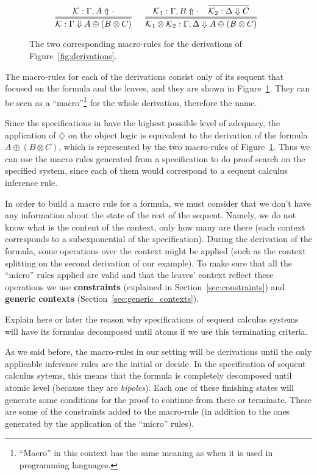 \begin{figure}
$$
\infer=[]{\mathcal{K} : \Gamma \Downarrow A \oplus (B \otimes C)}{\mathcal{K} :
\Gamma, A \Uparrow \cdot}
\;\;\;\;
\infer=[]{\mathcal{K}_1 \otimes \mathcal{K}_2 : \Gamma, \Delta \Downarrow A \oplus (B \otimes C)}
{
  \mathcal{K}_1 : \Gamma, B \Uparrow \cdot \;\;\;\;
  \infer[]{\mathcal{K}_2 : \Delta \Downarrow C}{}
}
$$
\caption{The two corresponding macro-rules for the derivations of
Figure~\ref{fig:derivations}.}
\label{fig:macro}
\end{figure}


The macro-rules for each of the derivations consist only of its sequent that
focused on the formula and
the leaves, and they are shown in Figure~\ref{fig:macro}. They can be seen as a 
``macro''\footnote{``Macro'' in this context has
the same meaning as when it is used in programming languages.} for the whole 
derivation, therefore the name.

Since the specifications in \sellf have the highest possible level of adequacy, the
application of $\diamondsuit$ on the object logic is equivalent to the derivation of
the formula $A \oplus (B \otimes C)$, which is represented by the two macro-rules
of Figure~\ref{fig:macro}. Thus we can use the macro rules generated from a
specification to do proof search on the specified system, since each of them
would correspond to a sequent calculus inference rule. 

In order to build a macro rule for a formula, we must consider that we don't
have any information about the state of the rest of the sequent. Namely, we do
not know what is the content of the context, only how many are there (each
context corresponds to a subexponential of the specification). During the
derivation of the formula, some operations over the context might be applied
(such as the context splitting on the second derivation of our example). To
make sure that all the ``micro'' rules applied are valid and that the leaves'
context reflect these operations we use
\textbf{constraints} (explained in Section~\ref{sec:constraints}) and
\textbf{generic contexts} (Section~\ref{sec:generic_contexts}).

\begin{giselle}
Explain here or later the reason why specifications of sequent calculus systems
will have its formulas decomposed until atoms if we use this terminating
criteria.
\end{giselle}

As we said before, the macro-rules in our setting will be derivations until the
only applicable inference rules are the initial or decide. In the specification
of sequent calculus sytems, this means that the formula is completely decomposed
until atomic level (because they are \textit{bipoles}). 
Each one of these finishing states will generate some
conditions for the proof to continue from there or terminate.
These are some of the constraints added to the macro-rule (in addition to the
ones generated by the application of the ``micro'' rules).

